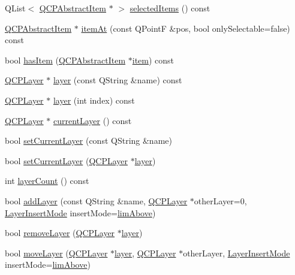 \begin{DoxyCompactItemize}
Q\+List$<$ \hyperlink{classQCPAbstractItem}{Q\+C\+P\+Abstract\+Item} $\ast$ $>$ \hyperlink{classQCustomPlot_afda487bcf2d6cf1a57173d82495e29ba}{selected\+Items} () const
\item 
\hyperlink{classQCPAbstractItem}{Q\+C\+P\+Abstract\+Item} $\ast$ \hyperlink{classQCustomPlot_ac08578e0e6c059c83a8d340ba0038e8e}{item\+At} (const Q\+PointF \&pos, bool only\+Selectable=false) const
\item 
bool \hyperlink{classQCustomPlot_af0b57f35646079f93fa6161a65b36109}{has\+Item} (\hyperlink{classQCPAbstractItem}{Q\+C\+P\+Abstract\+Item} $\ast$\hyperlink{classQCustomPlot_ac042f2e78edd228ccf2f26b7fe215239}{item}) const
\item 
\hyperlink{classQCPLayer}{Q\+C\+P\+Layer} $\ast$ \hyperlink{classQCustomPlot_a0a96244e7773b242ef23c32b7bdfb159}{layer} (const Q\+String \&name) const
\item 
\hyperlink{classQCPLayer}{Q\+C\+P\+Layer} $\ast$ \hyperlink{classQCustomPlot_acbb570f4c24306e7c2324d40bfe157c2}{layer} (int index) const
\item 
\hyperlink{classQCPLayer}{Q\+C\+P\+Layer} $\ast$ \hyperlink{classQCustomPlot_a0421d647f420b0b4c57aec1708857af5}{current\+Layer} () const
\item 
bool \hyperlink{classQCustomPlot_a73a6dc47c653bb6f8f030abca5a11852}{set\+Current\+Layer} (const Q\+String \&name)
\item 
bool \hyperlink{classQCustomPlot_a23a4d3cadad1a0063c5fe19aac5659e6}{set\+Current\+Layer} (\hyperlink{classQCPLayer}{Q\+C\+P\+Layer} $\ast$\hyperlink{classQCustomPlot_a0a96244e7773b242ef23c32b7bdfb159}{layer})
\item 
int \hyperlink{classQCustomPlot_afa45d61e65292026f4c58c9c88c2cef0}{layer\+Count} () const
\item 
bool \hyperlink{classQCustomPlot_ad5255393df078448bb6ac83fa5db5f52}{add\+Layer} (const Q\+String \&name, \hyperlink{classQCPLayer}{Q\+C\+P\+Layer} $\ast$other\+Layer=0, \hyperlink{classQCustomPlot_a75a8afbe6ef333b1f3d47abb25b9add7}{Layer\+Insert\+Mode} insert\+Mode=\hyperlink{classQCustomPlot_a75a8afbe6ef333b1f3d47abb25b9add7a062b0b7825650b432a713c0df6742d41}{lim\+Above})
\item 
bool \hyperlink{classQCustomPlot_a40f75e342c5eaab6a86066a42a0e2a94}{remove\+Layer} (\hyperlink{classQCPLayer}{Q\+C\+P\+Layer} $\ast$\hyperlink{classQCustomPlot_a0a96244e7773b242ef23c32b7bdfb159}{layer})
\item 
bool \hyperlink{classQCustomPlot_ae896140beff19424e9e9e02d6e331104}{move\+Layer} (\hyperlink{classQCPLayer}{Q\+C\+P\+Layer} $\ast$\hyperlink{classQCustomPlot_a0a96244e7773b242ef23c32b7bdfb159}{layer}, \hyperlink{classQCPLayer}{Q\+C\+P\+Layer} $\ast$other\+Layer, \hyperlink{classQCustomPlot_a75a8afbe6ef333b1f3d47abb25b9add7}{Layer\+Insert\+Mode} insert\+Mode=\hyperlink{classQCustomPlot_a75a8afbe6ef333b1f3d47abb25b9add7a062b0b7825650b432a713c0df6742d41}{lim\+Above})

\end{DoxyCompactItemize}
